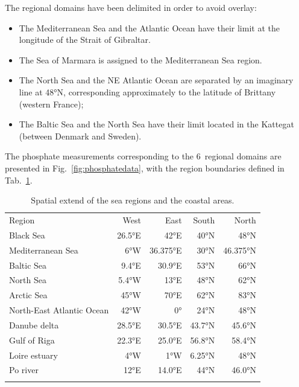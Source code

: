 \documentclass[essd, manuscript]{copernicus}
\begin{document}
The regional domains have been delimited in order to avoid overlay:
\begin{itemize}
\item The Mediterranean Sea and the Atlantic Ocean have their limit at the longitude of the Strait of Gibraltar.
\item The Sea of Marmara is assigned to the Mediterranean Sea region.
\item The North Sea and the NE Atlantic Ocean are separated by an imaginary line at 48°N, corresponding approximately to the latitude of Brittany (western France);
\item The Baltic Sea and the North Sea have their limit located in the Kattegat (between Denmark and Sweden).
\end{itemize}

The phosphate measurements corresponding to the 6~regional domains are presented in Fig.~\ref{fig:phosphatedata}, with the region boundaries defined in Tab.~\ref{tab:regions}. 

\begin{table}
\caption{Spatial extend of the sea regions and the coastal areas.\label{tab:regions}}
\begin{tabular}{lrrrr}
\tophline
Region	 					& West		& East		& South 		& North 	 	\\ 
\middlehline	
Black Sea					& 26.5°E 	& 42°E		& 40°N		& 48°N	 	\\
Mediterranean Sea			& 6°W		& 36.375°E	& 30°N		& 46.375°N	\\
Baltic Sea					& 9.4°E		& 30.9°E		& 53°N		& 66°N		\\
North Sea 					& 5.4°W 		& 13°E		& 48°N		& 62°N		\\
Arctic Sea 					& 45°W 		& 70°E		& 62°N		& 83°N		\\
North-East Atlantic Ocean 	& 42°W		& 0° 		& 24°N		& 48°N		\\
\middlehline	
Danube delta					& 28.5°E		& 30.5°E		& 43.7°N 	& 45.6°N		\\
Gulf of Riga 				& 22.3°E 	& 25.0°E 	& 56.8°N 	& 58.4°N		\\
Loire estuary				& 4°W		& 1°W 		& 6.25°N		& 48°N		\\
Po river						& 12°E		& 14.0°E		& 44°N		& 46.0°N		\\
\bottomhline
\end{tabular}
\end{table}


		

\subsection{}
\end{document}
